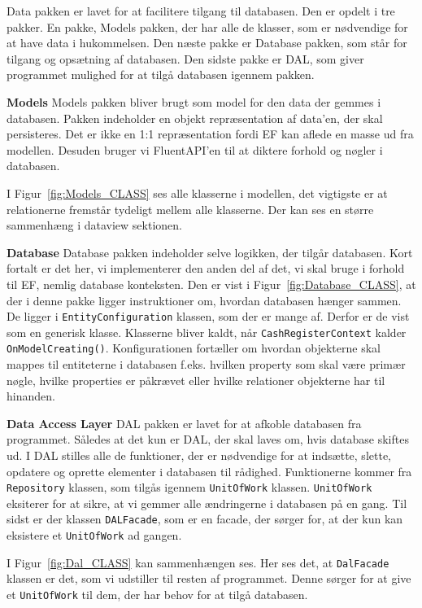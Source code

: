 Data pakken er lavet for at facilitere tilgang til databasen. Den er opdelt i tre pakker. En pakke, Models pakken, der har alle de klasser, som er nødvendige for at have data i hukommelsen. Den næste pakke er Database pakken, som står for tilgang og opsætning af databasen. Den sidste pakke er \gls{DAL}, som giver programmet mulighed for at tilgå databasen igennem pakken.
\newline\newline

\textbf{Models}\newline
Models pakken bliver brugt som model for den data der gemmes i databasen. Pakken indeholder en objekt repræsentation af data'en, der skal persisteres. Det er ikke en 1:1 repræsentation fordi \gls{EF} kan aflede en masse ud fra modellen. Desuden bruger vi \gls{FluentAPI}'en til at diktere forhold og nøgler i databasen.


I Figur~\ref{fig:Models_CLASS} ses alle klasserne i modellen, det vigtigste er at relationerne fremstår tydeligt mellem alle klasserne. Der kan ses en større sammenhæng i dataview sektionen.
\newline

\textbf{Database}\newline
Database pakken indeholder selve logikken, der tilgår databasen. Kort fortalt er det her, vi implementerer den anden del af det, vi skal bruge i forhold til \gls{EF}, nemlig database konteksten. 
Den er vist i Figur~\ref{fig:Database_CLASS}, at der i denne pakke ligger instruktioner om, hvordan databasen hænger sammen. De ligger i \texttt{EntityConfiguration} klassen, som der er mange af. Derfor er de vist som en generisk klasse.
Klasserne bliver kaldt, når \texttt{CashRegisterContext} kalder \texttt{OnModelCreating()}. Konfigurationen fortæller om hvordan objekterne skal mappes til entiteterne i databasen f.eks. hvilken property som skal være primær nøgle, hvilke properties er påkrævet eller hvilke relationer objekterne har til hinanden. 

\textbf{Data Access Layer}\newline
\gls{DAL} pakken er lavet for at afkoble databasen fra programmet. 
Således at det kun er \gls{DAL}, der skal laves om, hvis database skiftes ud. 
I \gls{DAL} stilles alle de funktioner, der er nødvendige for at indsætte, slette, opdatere og oprette elementer i databasen til rådighed. 
Funktionerne kommer fra \texttt{Repository} klassen, som tilgås igennem \texttt{UnitOfWork} klassen.
\texttt{UnitOfWork} eksiterer for at sikre, at vi gemmer alle ændringerne i databasen på en gang.
Til sidst er der klassen \texttt{DALFacade}, som er en facade, der sørger for, at der kun kan eksistere et \texttt{UnitOfWork} ad gangen. 


I Figur~\ref{fig:Dal_CLASS} kan sammenhængen ses. Her ses det, at \texttt{DalFacade} klassen er det, som vi udstiller til resten af programmet. Denne sørger for at give et \texttt{UnitOfWork} til dem, der har behov for at tilgå databasen.